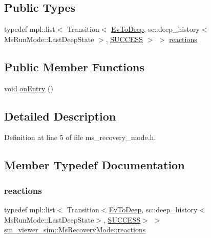 \subsection*{Public Types}
\begin{DoxyCompactItemize}
\item 
typedef mpl\+::list$<$ Transition$<$ \hyperlink{structsm__viewer__sim_1_1EvToDeep}{Ev\+To\+Deep}, sc\+::deep\+\_\+history$<$ Ms\+Run\+Mode\+::\+Last\+Deep\+State $>$, \hyperlink{structsmacc_1_1default__transition__tags_1_1SUCCESS}{S\+U\+C\+C\+E\+SS} $>$ $>$ \hyperlink{structsm__viewer__sim_1_1MsRecoveryMode_aed5fa1dd8ccebe3085331e82f1ca16d9}{reactions}
\end{DoxyCompactItemize}
\subsection*{Public Member Functions}
\begin{DoxyCompactItemize}
\item 
void \hyperlink{structsm__viewer__sim_1_1MsRecoveryMode_ab436ff9e90b963a3339644c0baf223d7}{on\+Entry} ()
\end{DoxyCompactItemize}


\subsection{Detailed Description}


Definition at line 5 of file ms\+\_\+recovery\+\_\+mode.\+h.



\subsection{Member Typedef Documentation}
\mbox{\label{structsm__viewer__sim_1_1MsRecoveryMode_aed5fa1dd8ccebe3085331e82f1ca16d9}} 
\subsubsection{\texorpdfstring{reactions}{reactions}}
{\footnotesize\ttfamily typedef mpl\+::list$<$ Transition$<$\hyperlink{structsm__viewer__sim_1_1EvToDeep}{Ev\+To\+Deep}, sc\+::deep\+\_\+history$<$Ms\+Run\+Mode\+::\+Last\+Deep\+State$>$, \hyperlink{structsmacc_1_1default__transition__tags_1_1SUCCESS}{S\+U\+C\+C\+E\+SS}$>$ $>$ \hyperlink{structsm__viewer__sim_1_1MsRecoveryMode_aed5fa1dd8ccebe3085331e82f1ca16d9}{sm\+\_\+viewer\+\_\+sim\+::\+Ms\+Recovery\+Mode\+::reactions}}



